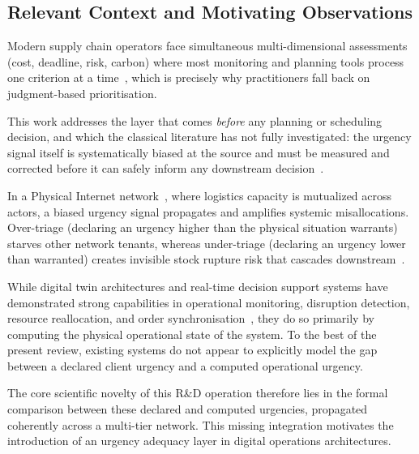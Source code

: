 \subsection{Relevant Context and Motivating Observations}

Modern supply chain operators face simultaneous multi-dimensional assessments (cost, deadline, risk, carbon) where most monitoring and planning tools process one criterion at a time~\autocite{pinedo2012scheduling,chakrabortty2020efficient}, which is precisely why practitioners fall back on judgment-based prioritisation.

This work addresses the layer that comes \emph{before} any planning or scheduling decision, and which the classical literature has not fully investigated: the urgency signal itself is systematically biased at the source and must be measured and corrected before it can safely inform any downstream decision~\autocite{zhu2018mere,rusou2020psychology}.

In a Physical Internet network~\autocite{montreuil2011toward}, where logistics capacity is mutualized across actors, a biased urgency signal propagates and amplifies systemic misallocations. Over-triage (declaring an urgency higher than the physical situation warrants) starves other network tenants, whereas under-triage (declaring an urgency lower than warranted) creates invisible stock rupture risk that cascades downstream~\autocite{li2020exploring,ivanov2020digital}.

While digital twin architectures and real-time decision support systems have demonstrated strong capabilities in operational monitoring, disruption detection, resource reallocation, and order synchronisation~\autocite{ding2023realtime,leung2022digital,hrusovsky2021realtime,karam2022realtime,zhu2025industry5}, they do so primarily by computing the physical operational state of the system. To the best of the present review, existing systems do not appear to explicitly model the gap between a declared client urgency and a computed operational urgency.

The core scientific novelty of this R\&D operation therefore lies in the formal comparison between these declared and computed urgencies, propagated coherently across a multi-tier network. This missing integration motivates the introduction of an urgency adequacy layer in digital operations architectures.

